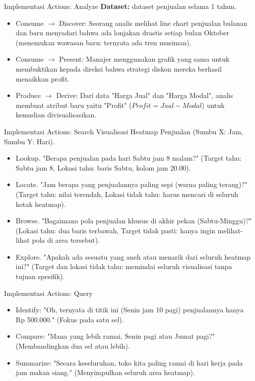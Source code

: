 \documentclass[t]{beamer}
\begin{document}
\begin{frame}{Implementasi Actions: Analyze }
    \textbf{Dataset:} dataset penjualan selama 1 tahun.
    \begin{itemize}
    	\item Consume $\rightarrow$ Discover: Seorang analis melihat line chart penjualan bulanan dan baru menyadari bahwa ada lonjakan drastis setiap bulan Oktober (menemukan wawasan baru: ternyata ada tren musiman).
    	\item Consume $\rightarrow$ Present: Manajer menggunakan grafik yang sama untuk membuktikan kepada direksi bahwa strategi diskon mereka berhasil menaikkan profit.
    	\item Produce $\rightarrow$ Derive: Dari data "Harga Jual" dan "Harga Modal", analis membuat atribut baru yaitu "Profit" ($Profit = Jual - Modal$) untuk kemudian divisualisasikan.
    \end{itemize}
    
\end{frame}


\begin{frame}{Implementasi Actions: Search }
Visualisasi Heatmap Penjualan (Sumbu X: Jam, Sumbu Y: Hari).
\begin{itemize}
	\item Lookup. "Berapa penjualan pada hari Sabtu jam 8 malam?" (Target tahu: Sabtu jam 8, Lokasi tahu: baris Sabtu, kolom jam 20.00).
	\item Locate. "Jam berapa yang penjualannya paling sepi (warna paling terang)?" (Target tahu: nilai terendah, Lokasi tidak tahu: harus mencari di seluruh kotak heatmap).
	\item Browse. "Bagaimana pola penjualan khusus di akhir pekan (Sabtu-Minggu)?" (Lokasi tahu: dua baris terbawah, Target tidak pasti: hanya ingin melihat-lihat pola di area tersebut).
	\item Explore. "Apakah ada sesuatu yang aneh atau menarik dari seluruh heatmap ini?" (Target dan lokasi tidak tahu: memindai seluruh visualisasi tanpa tujuan spesifik).
\end{itemize}
\end{frame}



\begin{frame}{Implementasi Actions: Query }
\begin{itemize}
	\item Identify: "Oh, ternyata di titik ini (Senin jam 10 pagi) penjualannya hanya Rp 500.000." (Fokus pada satu sel).
	\item Compare: "Mana yang lebih ramai, Senin pagi atau Jumat pagi?" (Membandingkan dua sel atau lebih).
	\item Summarize: "Secara keseluruhan, toko kita paling ramai di hari kerja pada jam makan siang." (Menyimpulkan seluruh area heatmap).
\end{itemize}

\end{frame}
\end{document}

